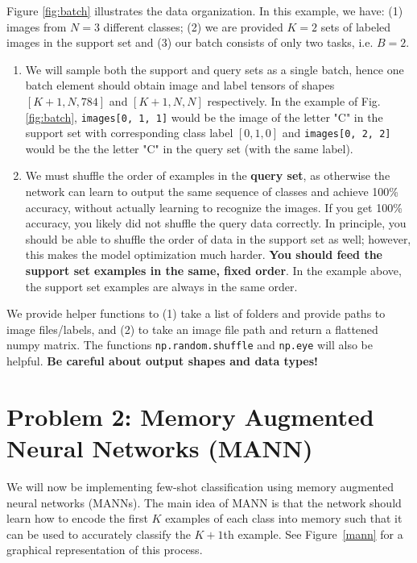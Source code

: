 \documentclass[12pt]{article}
\begin{document}
Figure \ref{fig:batch} illustrates the data organization. In this example, we have: (1) images from $N=3$ different classes; (2) we are provided $K=2$ sets of labeled images in the support set and (3) our batch consists of only two tasks, i.e. $B=2$. 
\begin{enumerate}
    \item We will sample both the support and query sets as a single batch, hence one batch element should obtain image and label tensors of shapes $[K+1, N, 784]$  and $[K+1, N, N]$ respectively. In the example of Fig. \ref{fig:batch}, \texttt{images[0, 1, 1]} would be the image of the letter "C" in the support set with corresponding class label $[0, 1, 0]$ and \texttt{images[0, 2, 2]} would be the the letter "C" in the query set (with the same label).

    \item We must shuffle the order of examples in the \textbf{query set}, as otherwise the network can learn to output the same sequence of classes and achieve 100\% accuracy, without actually learning to recognize the images. If you get 100\% accuracy, you likely did not shuffle the query data correctly. In principle, you should be able to shuffle the order of data in the support set as well; however, this makes the model optimization much harder. \textbf{You should feed the support set examples in the same, fixed order}. In the example above, the support set examples are always in the same order.

\end{enumerate}

\noindent We provide helper functions to (1) take a list of folders and provide paths to image files/labels, and (2) to take an image file path and return a flattened numpy matrix. The functions \texttt{np.random.shuffle} and \texttt{np.eye} will also be helpful. \textbf{Be careful about output shapes and data types!}




\section*{Problem 2: Memory Augmented Neural Networks (MANN)     \cite{pmlr-v48-santoro16,DBLP:journals/corr/MishraRCA17}}

We will now be implementing few-shot classification using memory augmented neural networks (MANNs). The main idea of MANN is that the network should learn how to encode the first $K$ examples of each class into memory such that it can be used to accurately classify the $K+1$th example. See Figure~\ref{mann} for a graphical representation of this process.
\end{document}
